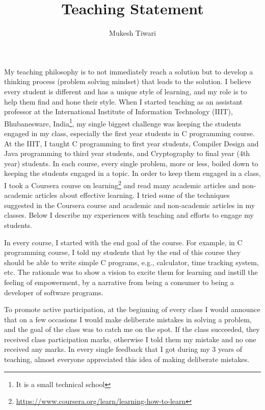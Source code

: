 \documentclass[a4paper]{article}
\title{Teaching Statement}
\author{Mukesh Tiwari}
\date{}
\begin{document}
\fontsize{12}{15}
\selectfont
\maketitle


My teaching philosophy is to not immediately reach a solution but to develop a 
thinking process (problem solving mindset) that leads to the solution. I believe every 
student is different and has a unique style of learning, and my role is to help them find 
and hone their style. When I started teaching as an assistant professor at the International Institute of Information 
Technology (IIIT), Bhubanesware, India\footnote{It is a small technical school},
my single biggest challenge was keeping the students engaged in my class, especially the first year 
students in C programming course. At the IIIT, I taught C programming to 
first year students, Compiler Design and Java programming to third year students, and
Cryptography to final year (4th year) students. In each course, every single 
problem,  more or less, boiled down to keeping the students engaged in a topic. 
In order to keep them engaged in a class, I took a Coursera course on 
learning\footnote{\url{https://www.coursera.org/learn/learning-how-to-learn}} and 
read many academic articles and non-academic articles about effective learning.
I tried some of the techniques suggested in the Coursera course and 
academic and non-academic articles in my classes. Below I 
describe my experiences with teaching and efforts to engage my students. 






In every course, I started with the end goal of the course. For example, 
in C programming course, I told my students that by the end of this 
course they should be 
able to write simple C programs, e.g., calculator, time tracking system, etc. 
The rationale was 
to show a vision to excite them 
for learning and instill the feeling of empowerment, by a narrative from
being a consumer to being a developer of software programs.



To promote active participation, at the beginning of every class I would announce that 
on a few occasions I would make deliberate mistakes in solving a problem, and the
goal of the class was to catch me on the spot.
If the class succeeded, they received  
class participation marks, otherwise I told them my 
mistake and no one received any marks. In every single 
feedback that I got during my 3 years of teaching, 
almost everyone appreciated this idea of making deliberate mistakes. 
\end{document}
